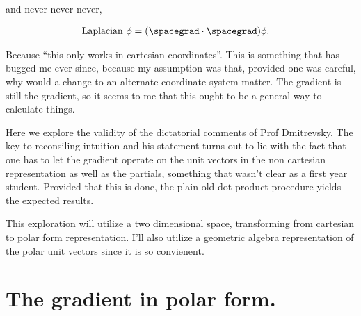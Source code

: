 and never never never, 

\begin{align}\label{eqn:divGradCurLap:3}
\text{Laplacian}\  \phi &= (\spacegrad \cdot \spacegrad) \phi.
\end{align}

Because ``this only works in cartesian coordinates''.  This is something that has bugged me ever since, because my assumption was that, provided one was careful, why would a change to an alternate coordinate system matter.  The gradient is still the gradient, so it seems to me that this ought to be a general way to calculate things.

Here we explore the validity of the dictatorial comments of Prof Dmitrevsky.  The key to reconsiling intuition and his statement turns out to lie with the fact that one has to let the gradient operate on the unit vectors in the non cartesian representation as well as the partials, something that wasn't clear as a first year student.  Provided that this is done, the plain old dot product procedure yields the expected results.

This exploration will utilize a two dimensional space, transforming from cartesian to polar form representation.  I'll also utilize a geometric algebra representation of the polar unit vectors since it is so convienent.

\section{The gradient in polar form.}

\EndArticle
